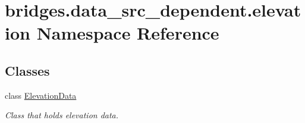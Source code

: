 \hypertarget{namespacebridges_1_1data__src__dependent_1_1elevation}{}\section{bridges.\+data\+\_\+src\+\_\+dependent.\+elevation Namespace Reference}
\label{namespacebridges_1_1data__src__dependent_1_1elevation}
\subsection*{Classes}
\begin{DoxyCompactItemize}
\item 
class \hyperlink{classbridges_1_1data__src__dependent_1_1elevation_1_1_elevation_data}{Elevation\+Data}
\begin{DoxyCompactList}\small\item\em Class that holds elevation data. \end{DoxyCompactList}\end{DoxyCompactItemize}
